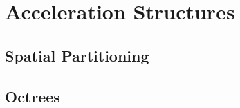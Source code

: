 \section{Acceleration Structures}
\label{chap:enhancements}

\subsection{Spatial Partitioning}
\label{sec:spatial-partitioning}

\subsection{Octrees}
\label{sec:octrees}